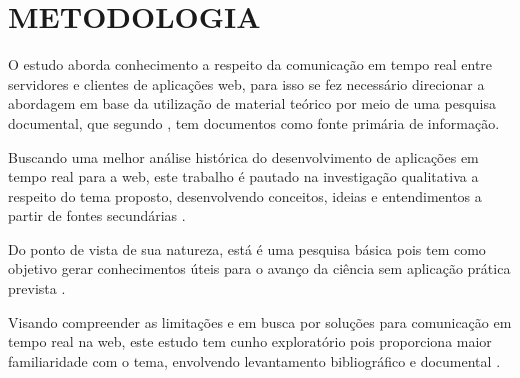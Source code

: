 \section{METODOLOGIA}

O estudo aborda conhecimento a respeito da comunicação em tempo real entre servidores e clientes de aplicações web, para isso se fez necessário direcionar a abordagem em base da utilização de material teórico por meio de uma pesquisa documental, que segundo \cite{Marconi2003}, tem documentos como fonte primária de informação.

Buscando uma melhor análise histórica do desenvolvimento de aplicações em tempo real para a web, este trabalho é pautado na investigação qualitativa a respeito do tema proposto, desenvolvendo conceitos, ideias e entendimentos a partir de fontes secundárias \cite{prodanov2013metodologia}.

Do ponto de vista de sua natureza, está é uma pesquisa básica pois tem como objetivo gerar conhecimentos úteis para o avanço da ciência sem aplicação prática prevista \cite{prodanov2013metodologia}.

Visando compreender as limitações e em busca por soluções para comunicação em tempo real na web, este estudo tem cunho exploratório pois proporciona maior familiaridade com o tema, envolvendo levantamento bibliográfico e documental \cite{gil2002elaborar}.